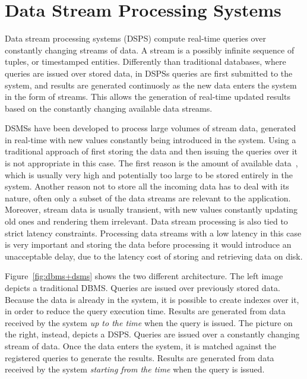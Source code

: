 \section{Data Stream Processing Systems}
\label{sec:sps-systems}

Data stream processing systems (DSPS) compute real-time queries over constantly changing streams of data. A stream is a 
possibly infinite sequence of tuples, or timestamped entities. Differently than traditional databases, where queries 
are issued over stored data, in DSPSs queries are first submitted to the system, and results are generated continuosly
as the new data enters the system in the form of streams. This allows the generation of real-time updated results based on the constantly changing available data streams.

DSMSs have been developed to process large volumes of stream data, generated in real-time with new
values constantly being introduced in the system. Using a traditional approach of first storing the data and then
issuing the queries over it is not appropriate in this case. The first reason is the amount of available
data~\cite{aurora, 8-reqs}, which is usually very high and potentially too large to be stored entirely in the system. 
Another reason not to store all
the incoming data has to deal with its nature, often only a subset of the data streams are relevant to the application.
Moreover, stream data is usually transient, with new values constantly updating old ones and rendering them irrelevant.
Data stream processing is also tied to strict latency constraints. Processing data streams with a low
latency in this case is very important and storing the data before processing it would introduce an
unacceptable delay, due to the latency cost of storing and retrieving data on disk.

Figure~\ref{fig:dbms+dsms} shows the two different architecture. The left image depicts a traditional DBMS. Queries are
issued over previously stored data. Because the data is already in the system, it is possible to create
indexes over it, in order to reduce the query execution time. Results are generated from data received by the system \emph{up to the
time} when the query is issued. The picture on the right, instead, depicts a DSPS. Queries are issued over a constantly
changing stream of data. Once the data enters the system, it is matched against the registered queries to generate the
results. Results are generated from data received by the system \emph{starting from the time} when the query is issued.

